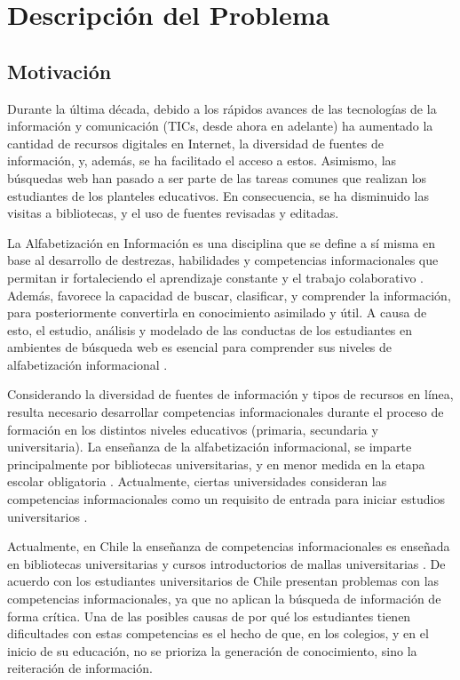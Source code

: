 \chapter{Descripción del Problema}
\label{chp:decripcion-problema}
\section{Motivación}
\label{sec:motivacion}
Durante la última década, debido a los rápidos avances de las tecnologías de la información y comunicación (TICs, desde ahora en adelante) ha aumentado la cantidad de recursos digitales en Internet, la diversidad de fuentes de información, y, además, se ha facilitado el acceso a estos. Asimismo, las búsquedas web han pasado a ser parte de las tareas comunes que realizan los estudiantes de los planteles educativos. En consecuencia, se ha disminuido las visitas a bibliotecas, y el uso de fuentes revisadas y editadas.

La Alfabetización en Información es una disciplina que se define a sí misma en base al desarrollo de destrezas, habilidades y competencias informacionales que permitan ir fortaleciendo el aprendizaje constante y el trabajo colaborativo \cite{american2000information}. Además, favorece la capacidad de buscar, clasificar, y comprender la información, para posteriormente convertirla en conocimiento asimilado y útil. A causa de esto, el estudio, análisis y modelado de las conductas de los estudiantes en ambientes de búsqueda web es esencial para comprender sus niveles de alfabetización informacional \cite{tseng2009meta}.

Considerando la diversidad de fuentes de información y tipos de recursos en línea, resulta necesario desarrollar competencias informacionales durante el proceso de formación en los distintos niveles educativos (primaria, secundaria y universitaria). La enseñanza de la alfabetización informacional, se imparte principalmente por bibliotecas universitarias, y en menor medida en la etapa escolar obligatoria \cite{weiner2014teaches}. Actualmente, ciertas universidades consideran las competencias informacionales como un requisito de entrada para iniciar estudios universitarios \cite{smith2013information}.

Actualmente, en Chile la enseñanza de competencias informacionales es enseñada en bibliotecas universitarias y cursos introductorios de mallas universitarias \cite{marzal2015diagnostico}. De acuerdo con \cite{urra2016alfabetizacion} los estudiantes universitarios de Chile presentan problemas con las competencias informacionales, ya que no aplican la búsqueda de información de forma crítica. Una de las posibles causas de por qué los estudiantes tienen dificultades con estas competencias es el hecho de que, en los colegios, y en el inicio de su educación, no se prioriza la generación de conocimiento, sino la reiteración de información.

